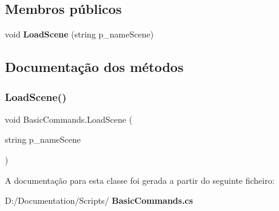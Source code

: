 \subsection*{Membros públicos}
\begin{DoxyCompactItemize}
\item 
void \textbf{ Load\+Scene} (string p\+\_\+name\+Scene)
\end{DoxyCompactItemize}


\subsection{Documentação dos métodos}
\mbox{\label{class_basic_commands_a73ef84cc19c548070d1d874994066822}} 
\subsubsection{LoadScene()}
{\footnotesize\ttfamily void Basic\+Commands.\+Load\+Scene (\begin{DoxyParamCaption}\item[{string}]{p\+\_\+name\+Scene }\end{DoxyParamCaption})}



A documentação para esta classe foi gerada a partir do seguinte ficheiro\+:\begin{DoxyCompactItemize}
\item 
D\+:/\+Documentation/\+Scripts/\textbf{ Basic\+Commands.\+cs}\end{DoxyCompactItemize}

